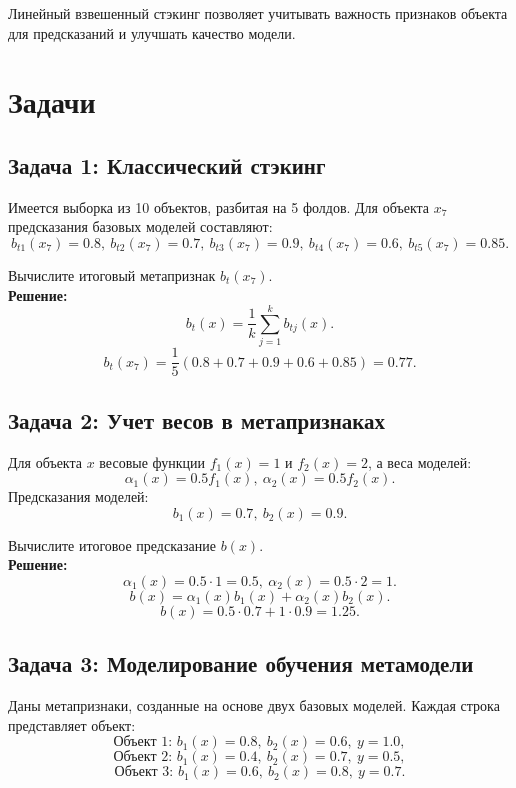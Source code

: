 Линейный взвешенный стэкинг позволяет учитывать важность признаков объекта для предсказаний и улучшать качество модели.


\section*{Задачи}

\subsection*{Задача 1: Классический стэкинг}

Имеется выборка из 10 объектов, разбитая на 5 фолдов. Для объекта \( x_7 \) предсказания базовых моделей составляют:
\[
b_{t1}(x_7) = 0.8, \ b_{t2}(x_7) = 0.7, \ b_{t3}(x_7) = 0.9, \ b_{t4}(x_7) = 0.6, \ b_{t5}(x_7) = 0.85.
\]

Вычислите итоговый метапризнак \( b_t(x_7) \).
\\
\textbf{Решение:}
\[
b_t(x) = \frac{1}{k} \sum_{j=1}^k b_{tj}(x).
\]
\[
b_t(x_7) = \frac{1}{5} (0.8 + 0.7 + 0.9 + 0.6 + 0.85) = 0.77.
\]



\subsection*{Задача 2: Учет весов в метапризнаках}

Для объекта \( x \) весовые функции \( f_1(x) = 1 \) и \( f_2(x) = 2 \), а веса моделей:
\[
\alpha_1(x) = 0.5 f_1(x), \ \alpha_2(x) = 0.5 f_2(x).
\]
Предсказания моделей:
\[
b_1(x) = 0.7, \ b_2(x) = 0.9.
\]

Вычислите итоговое предсказание \( b(x) \).
\\
\textbf{Решение:}
\[
\alpha_1(x) = 0.5 \cdot 1 = 0.5, \ \alpha_2(x) = 0.5 \cdot 2 = 1.
\]
\[
b(x) = \alpha_1(x) b_1(x) + \alpha_2(x) b_2(x).
\]
\[
b(x) = 0.5 \cdot 0.7 + 1 \cdot 0.9 = 1.25.
\]



\subsection*{Задача 3: Моделирование обучения метамодели}

Даны метапризнаки, созданные на основе двух базовых моделей. Каждая строка представляет объект:
\[
\text{Объект 1: } b_1(x) = 0.8, \ b_2(x) = 0.6, \ y = 1.0,
\]
\[
\text{Объект 2: } b_1(x) = 0.4, \ b_2(x) = 0.7, \ y = 0.5,
\]
\[
\text{Объект 3: } b_1(x) = 0.6, \ b_2(x) = 0.8, \ y = 0.7.
\]

